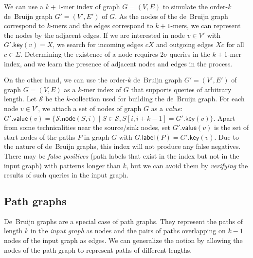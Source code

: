\documentclass[a4paper,UKenglish]{lipics-v2016}
\newcommand{\set}[1]{\ensuremath{\{ #1 \}}}
\newcommand{\glabel}{\ensuremath{\mathsf{label}}}
\newcommand{\gkey}{\ensuremath{\mathsf{key}}}
\newcommand{\gvalue}{\ensuremath{\mathsf{value}}}
\newcommand{\gnode}{\ensuremath{\mathsf{node}}}
\newcommand{\kmer}[1]{$#1$\nobreakdash-mer}
\newcommand{\kcollection}[1]{$#1$\nobreakdash-collection}
\newcommand{\orderk}[1]{order\nobreakdash-$#1$}
\begin{document}
We can use a \kmer{k+1} index of graph $G = (V, E)$ to simulate the \orderk{k} de~Bruijn graph $G' = (V', E')$ of $G$. As the nodes of the de~Bruijn graph correspond to \kmer{k}s and the edges correspond to \kmer{k+1}s, we can represent the nodes by the adjacent edges. If we are interested in node $v \in V'$ with $G'.\gkey(v) = X$, we search for incoming edges $cX$ and outgoing edges $Xc$ for all $c \in \Sigma$. Determining the existence of a node requires $2 \sigma$ queries in the \kmer{k+1} index, and we learn the presence of adjacent nodes and edges in the process.

On the other hand, we can use the \orderk{k} de~Bruijn graph $G' = (V', E')$ of graph $G = (V, E)$ as a \kmer{k} index of $G$ that supports queries of arbitrary length. Let $\mathcal{S}$ be the \kcollection{k} used for building the de~Bruijn graph. For each node $v \in V'$, we attach a set of nodes of graph $G$ as a \emph{value}: $G'.\gvalue(v) = \set{ \mathcal{S}.\gnode(S, i) \mid S \in \mathcal{S}, S[i, i+k-1] = G'.\gkey(v)}.$ Apart from some technicalities near the source/sink nodes, set $G'.\gvalue(v)$ is the set of start nodes of the paths $P$ in graph $G$ with $G.\glabel(P) = G'.\gkey(v)$. Due to the nature of de~Bruijn graphs, this index will not produce any false negatives. There may be \emph{false positives} (path labels that exist in the index but not in the input graph) with patterns longer than $k$, but we can avoid them by \emph{verifying} the results of such queries in the input graph.

\subsection{Path graphs}

De~Bruijn graphs are a special case of path graphs. They represent the paths of length $k$ in the \emph{input graph} as nodes and the pairs of paths overlapping on $k-1$ nodes of the input graph as edges. We can generalize the notion by allowing the nodes of the path graph to represent paths of different lengths.
\end{document}
